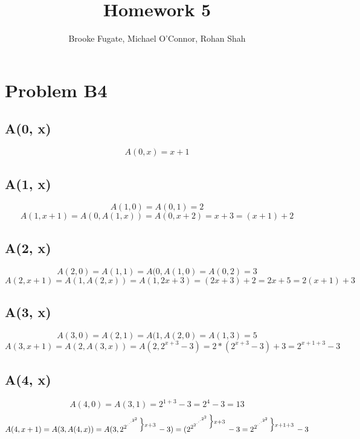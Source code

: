 \documentclass[12pt]{article}
\begin{document}
\pagestyle{plain}
\titleformat{\subsection}[runin]
  {\normalfont\large\bfseries}{\thesubsection}{1em}{}
\titleformat{\subsubsection}[runin]
  {\bfseries}{}{1em}{}

\title{Homework 5}
\author{Brooke Fugate, Michael O'Connor, Rohan Shah}
\date{}

\maketitle

\section*{Problem B4}
\subsection*{A(0, x)} 
$$A(0, x) = x + 1$$
\subsection*{A(1, x)}
$$A(1, 0) = A(0, 1) = 2$$
$$A(1, x + 1) = A(0, A(1, x)) = A(0, x + 2) = x + 3 = (x + 1) +2$$
\subsection*{A(2, x)} 
$$A(2, 0) = A(1, 1) = A(0, A(1, 0) = A(0, 2) = 3$$
$$A(2, x + 1) = A(1, A(2, x)) = A(1, 2x + 3) = (2x + 3) +2 = 2x + 5 = 2(x + 1) + 3$$
\subsection*{A(3, x)} 
$$A(3, 0) = A(2, 1) = A(1, A(2, 0) = A(1, 3) = 5$$
$$A(3, x + 1) = A(2, A(3, x)) = A(2, 2^{x + 3} - 3) = 2*(2^{x+3} - 3)  + 3 = 2^{x + 1 + 3} - 3$$
\subsection*{A(4, x)} 
$$A(4, 0) = A(3, 1) = 2^{1 + 3} - 3 = 2^4 -3 = 13$$
$$A(4, x + 1) = A(3, A(4, x)) = A(3,  \supexpo{2}{2}{x + 3}\> - 3) = (2^{\supexpo{2}{2}{x + 3}\>} - 3 = \supexpo{2}{2}{x + 1 + 3}\> - 3$$
\end{document}
